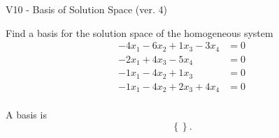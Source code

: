 \begin{exercise}
  \begin{exerciseTitle}V10 - Basis of Solution Space (ver. 4)\end{exerciseTitle}
  \begin{exerciseStatement}
    Find a basis for the solution space of the homogeneous system 
\begin{align*}
 -4 x_ 1 -6 x_ 2 + 1 x_ 3 -3 x_ 4 &= 0  \\ 
  -2 x_ 1 + 4 x_ 3 -5 x_ 4 &= 0  \\ 
  -1 x_ 1 -4 x_ 2 + 1 x_ 3 &= 0  \\ 
  -1 x_ 1 -4 x_ 2 + 2 x_ 3 + 4 x_ 4 &= 0  \\ 
 \end{align*}


 
  \end{exerciseStatement}

  \begin{exerciseAnswer}
   A basis is   
\[\left\{\right\}.\]

  


  \end{exerciseAnswer}
\end{exercise}